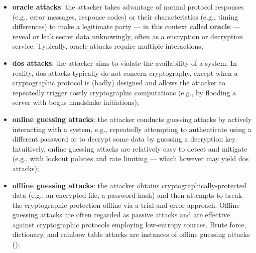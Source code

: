 \begin{itemize}
	\item \textbf{oracle attacks}: the attacker takes advantage of normal protocol responses (e.g., error messages, response codes) or their characteristics (e.g., timing differences) to make a legitimate party --- in this context called \textbf{oracle} --- reveal or leak secret data unknowingly, often as a encryption or decryption service. Typically, oracle attacks require multiple interactions;
	
	
	\item \textbf{\gls{dos} attacks}: the attacker aims to violate the availability of a system. In reality, \gls{dos} attacks typically do not concern cryptography, except when a cryptographic protocol is (badly) designed and allows the attacker to repeatedly trigger costly cryptographic computations (e.g., by flooding a server with bogus handshake initiations);
	
	\item \textbf{online guessing attacks}: the attacker conducts guessing attacks by actively interacting with a system, e.g., repeatedly attempting to authenticate using a different password or to decrypt some data by guessing a decryption key. Intuitively, online guessing attacks are relatively easy to detect and mitigate (e.g., with lockout policies and rate limiting --- which however may yield \gls{dos} attacks);
	
	\item \textbf{offline guessing attacks}: the attacker obtains cryptographically-protected data (e.g., an encrypted file, a password hash) and then attempts to break the cryptographic protection offline via a trial-and-error approach. Offline guessing attacks are often regarded as passive attacks and are effective against cryptographic protocols employing low-entropy sources.
	Brute force, dictionary, and rainbow table attacks are instances of offline guessing attacks ();
	

\end{itemize}
